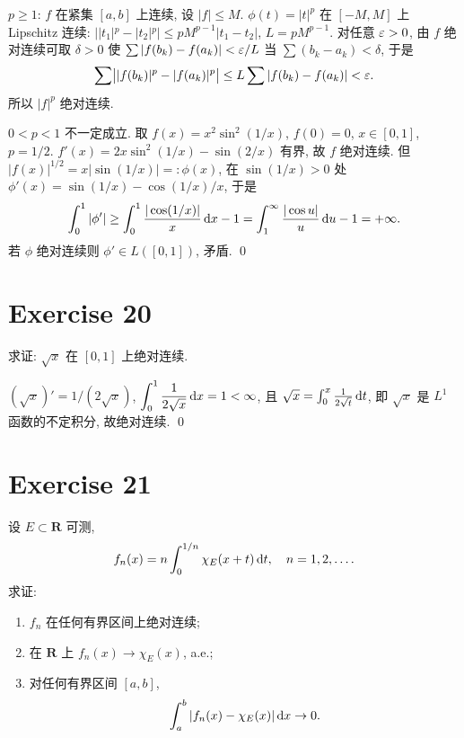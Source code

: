 \documentclass{article}
\begin{document}
\begin{solution}
  $p\ge 1$: $f$ 在紧集 $[a,b]$ 上连续, 设 $|f|\le M$.
  $\phi(t)=|t|^p$ 在 $[-M,M]$ 上 Lipschitz 连续:
  $||t_1|^p-|t_2|^p|\le pM^{p-1}|t_1-t_2|$, $L=pM^{p-1}$.
  对任意 $\varepsilon>0$, 由 $f$ 绝对连续可取 $\delta>0$ 使
  $\sum|f(b_k)-f(a_k)|<\varepsilon/L$ 当 $\sum(b_k-a_k)<\delta$, 于是
  \[
    \sum\bigl||f(b_k)|^p-|f(a_k)|^p\bigr|\le L\sum|f(b_k)-f(a_k)|<\varepsilon.
  \]
  所以 $|f|^p$ 绝对连续.

  $0<p<1$ 不一定成立. 取 $f(x)=x^2\sin^2(1/x)$, $f(0)=0$, $x\in[0,1]$, $p=1/2$.
  $f'(x)=2x\sin^2(1/x)-\sin(2/x)$ 有界, 故 $f$ 绝对连续.
  但 $|f(x)|^{1/2}=x|\sin(1/x)|=:\phi(x)$, 在 $\sin(1/x)>0$ 处
  $\phi'(x)=\sin(1/x)-\cos(1/x)/x$, 于是
  \[
    \int_0^1|\phi'|\ge\int_0^1\frac{|\cos(1/x)|}{x}\,\mathrm{d} x-1
    =\int_1^{\infty}\frac{|\cos u|}{u}\,\mathrm{d} u-1=+\infty.
  \]
  若 $\phi$ 绝对连续则 $\phi'\in L([0,1])$, 矛盾. \qed
\end{solution}

\section{Exercise 20}

求证: $\sqrt{x}$ 在 $[0,1]$ 上绝对连续.

\begin{solution}
  $(\sqrt{x})'=1/(2\sqrt{x})$, $\displaystyle\int_0^1\frac{1}{2\sqrt{x}}\,\mathrm{d} x=1<\infty$,
  且 $\sqrt{x}=\int_0^x\frac{1}{2\sqrt{t}}\,\mathrm{d} t$,
  即 $\sqrt{x}$ 是 $L^1$ 函数的不定积分, 故绝对连续. \qed
\end{solution}

\section{Exercise 21}

设 $E \subset \mathbf{R}$ 可测,
\[
  f_n(x) = n \int_0^{1/n} \chi_E(x+t)\,\mathrm{d} t, \quad n = 1,2,\dots.
\]
求证:
\begin{enumerate}
  \renewcommand{\labelenumi}{(\roman{enumi})}
  \item $f_n$ 在任何有界区间上绝对连续;
  \item 在 $\mathbf{R}$ 上 $f_n(x) \to \chi_E(x)$, a.e.;
  \item 对任何有界区间 $[a,b]$,
    \[
      \int_a^b |f_n(x) - \chi_E(x)|\,\mathrm{d} x \to 0.
    \]
\end{enumerate}
\end{document}
